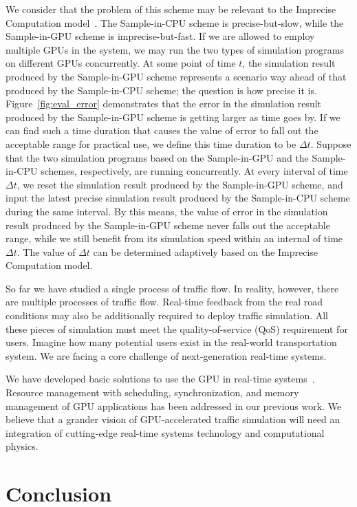 \documentclass[times, 10pt, twocolumn]{article}
\begin{document}
We consider that the problem of this scheme may be relevant to the
Imprecise Computation model~\cite{Lin1987}.
The Sample-in-CPU scheme is precise-but-slow, while the Sample-in-GPU
scheme is imprecise-but-fast.
If we are allowed to employ multiple GPUs in the system, we may run the
two types of simulation programs on different GPUs concurrently.
At some point of time $t$, the simulation result produced by the
Sample-in-GPU scheme represents a scenario way ahead of that produced by
the Sample-in-CPU scheme; the question is how precise it is.
Figure~\ref{fig:eval_error} demonstrates that the error in the
simulation result produced by the Sample-in-GPU scheme is getting larger
as time goes by.
If we can find such a time duration that causes the value of error to
fall out the acceptable range for practical use, we define this time
duration to be $\Delta t$.
Suppose that the two simulation programs based on the Sample-in-GPU and
the Sample-in-CPU schemes, respectively, are running concurrently.
At every interval of time $\Delta t$, we reset the simulation result
produced by the Sample-in-GPU scheme, and input the latest precise
simulation result produced by the Sample-in-CPU scheme during the same
interval.
By this means, the value of error in the simulation result produced by
the Sample-in-GPU scheme never falls out the acceptable range, while we
still benefit from its simulation speed within an internal of time
$\Delta t$.
The value of $\Delta t$ can be determined adaptively based on the
Imprecise Computation model.

So far we have studied a single process of traffic flow.
In reality, however, there are multiple processes of traffic flow.
Real-time feedback from the real road conditions may also be
additionally required to deploy traffic simulation.
All these pieces of simulation must meet the quality-of-service (QoS)
requirement for users.
Imagine how many potential users exist in the real-world transportation
system.
We are facing a core challenge of next-generation real-time systems.

We have developed basic solutions to use the GPU in real-time
systems~\cite{Kato2011_3, Kato2011_2, Kato2011_1, Kato2012}.
Resource management with scheduling, synchronization, and memory
management of GPU applications has been addressed in our previous
work.
We believe that a grander vision of GPU-accelerated traffic
simulation will need an integration of cutting-edge real-time systems
technology and computational physics.


\section{Conclusion}
\label{sec:conclusion}
\end{document}
